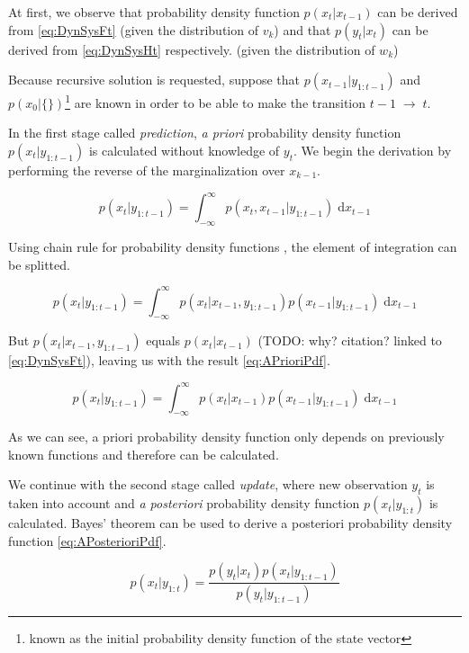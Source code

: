 \documentclass[a4paper,12pt,oneside]{report}
\newcommand{\pdf}{probability density function }
\newcommand{\pdfs}{probability density functions }
\begin{document}
At first, we observe that \pdf \(p(x_t|x_{t-1})\) can be derived from
\eqref{eq:DynSysFt} (given the distribution of \(v_k\)) and that \(p(y_t|x_t)\) can be derived from
\eqref{eq:DynSysHt} respectively. (given the distribution of \(w_k\))

Because recursive solution is requested, suppose that \(p(x_{t-1}|y_{1:t-1})\) and
\(p(x_0 | \{\})\)\footnote{known as the initial \pdf of the state vector} are known in order to be
able to make the transition \(t-1 \; \rightarrow \; t\).

In the first stage called \emph{prediction}, \emph{a priori} \pdf
\(p(x_t | y_{1:t-1})\) is calculated without knowledge of \(y_t\). We begin the derivation by
performing the reverse of the marginalization over \(x_{k-1}\).

\begin{equation*}
	p(x_t | y_{1:t-1}) = \int_{-\infty}^{\infty} p(x_t, x_{t-1} | y_{1:t-1}) \; \mathrm{d} x_{t-1}
\end{equation*}

Using chain rule for \pdfs, the element of integration can be splitted.

\begin{equation*}
	p(x_t | y_{1:t-1}) = \int_{-\infty}^{\infty} p(x_t | x_{t-1}, y_{1:t-1}) p(x_{t-1} | y_{1:t-1}) \; \mathrm{d} x_{t-1}
\end{equation*}

But \(p(x_t | x_{t-1}, y_{1:t-1})\) equals \(p(x_t | x_{t-1})\) (TODO: why? citation? linked to
\eqref{eq:DynSysFt}), leaving us with the result \eqref{eq:APrioriPdf}.

\begin{equation} \label{eq:APrioriPdf}
	p(x_t | y_{1:t-1}) = \int_{-\infty}^{\infty} p(x_t | x_{t-1}) p(x_{t-1} | y_{1:t-1}) \; \mathrm{d} x_{t-1}
\end{equation}

As we can see, a priori \pdf only depends on previously known functions and therefore can be
calculated.

We continue with the second stage called \emph{update}, where new observation \(y_t\) is taken into
account and \emph{a posteriori} \pdf \(p(x_t | y_{1:t})\) is calculated. Bayes' theorem can be used
to derive a posteriori \pdf \eqref{eq:APosterioriPdf}.

\begin{equation} \label{eq:APosterioriPdf}
	p(x_t | y_{1:t}) = \frac{p(y_t | x_t) p(x_t | y_{1:t-1})}{p(y_t | y_{1:t-1})}
\end{equation}
\end{document}
